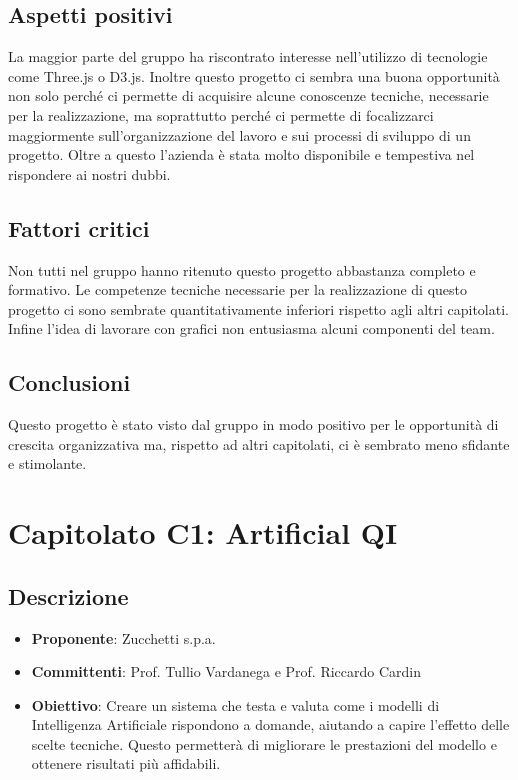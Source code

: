 \documentclass[italian, 12pt]{article}
\begin{document}
\subsection{Aspetti positivi}
La maggior parte del gruppo ha riscontrato interesse nell'utilizzo di tecnologie come Three.js o D3.js. Inoltre questo progetto ci sembra una buona opportunità non solo perché ci permette di  acquisire alcune conoscenze tecniche, necessarie per la realizzazione, ma soprattutto perché ci permette di focalizzarci maggiormente sull'organizzazione del lavoro e sui processi di sviluppo di un progetto. Oltre a questo l'azienda è stata molto disponibile e tempestiva nel rispondere ai nostri dubbi.
\subsection{Fattori critici}
Non tutti nel gruppo hanno ritenuto questo progetto abbastanza completo e formativo. Le competenze tecniche necessarie per la realizzazione di questo progetto ci sono sembrate quantitativamente inferiori rispetto agli altri capitolati. Infine l'idea di lavorare con grafici non entusiasma alcuni componenti del team.
\subsection{Conclusioni}
Questo progetto è stato visto dal gruppo in modo positivo per le opportunità di crescita organizzativa ma, rispetto ad altri capitolati, ci è sembrato meno sfidante e stimolante.

\section{Capitolato C1: Artificial QI}
\subsection{Descrizione}
\begin{itemize}
\item\textbf{Proponente}: Zucchetti s.p.a.
\item\textbf{Committenti}: Prof. Tullio Vardanega e Prof. Riccardo Cardin
\item\textbf{Obiettivo}: Creare un sistema che testa e valuta come i modelli di Intelligenza Artificiale rispondono a domande, aiutando a capire l'effetto delle scelte tecniche. Questo permetterà di migliorare le prestazioni del modello e ottenere risultati più affidabili.
\end{itemize}
\end{document}
